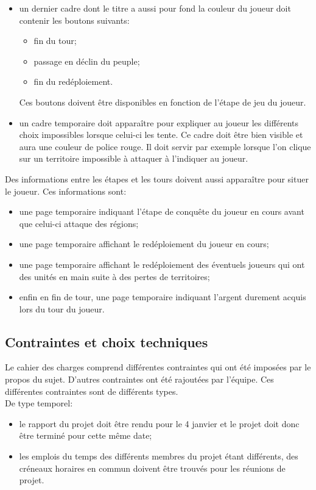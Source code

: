 \documentclass[a4paper, 11pt]{article}
\begin{document}
\begin{itemize}
				\item un dernier cadre dont le titre a aussi pour fond la couleur du joueur doit contenir les boutons suivants:
				\begin{itemize}
					\item fin du tour;
					\item passage en déclin du peuple;
					\item fin du redéploiement.
				\end{itemize}
				Ces boutons doivent être disponibles en fonction de l'étape de jeu du joueur. \\
				
				\item un cadre temporaire doit apparaître pour expliquer au joueur les différents choix impossibles lorsque celui-ci les tente. Ce cadre doit être bien visible et aura une couleur de police rouge. Il doit servir par exemple lorsque l'on clique sur un territoire impossible à attaquer à l'indiquer au joueur. \\
			\end{itemize}
			
			Des informations entre les étapes et les tours doivent aussi apparaître pour situer le joueur. Ces informations sont:
			\begin{itemize}
				\item une page temporaire indiquant l'étape de conquête du joueur en cours avant que celui-ci attaque des régions;
				\item une page temporaire affichant le redéploiement du joueur en cours;
				\item une page temporaire affichant le redéploiement des éventuels joueurs qui ont des unités en main suite à des pertes de territoires;
				\item enfin en fin de tour, une page temporaire indiquant l'argent durement acquis lors du tour du joueur.
			\end{itemize}
			
		\subsection{Contraintes et choix techniques}
		
		Le cahier des charges comprend différentes contraintes qui ont été imposées par le propos du sujet. D'autres contraintes ont été rajoutées par l'équipe. Ces différentes contraintes sont de différents types. \\
		
		De type temporel: 
		\begin{itemize}
			\item le rapport du projet doit être rendu pour le 4 janvier et le projet doit donc être terminé pour cette même date;
			\item les emplois du temps des différents membres du projet étant différents, des créneaux horaires en commun doivent être trouvés pour les réunions de projet. \\
		\end{itemize}
		
\end{document}
